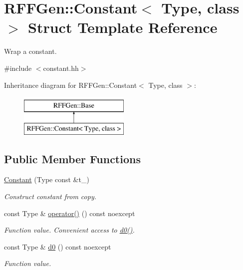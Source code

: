 \hypertarget{structRFFGen_1_1Constant}{\section{R\-F\-F\-Gen\-:\-:Constant$<$ Type, class $>$ Struct Template Reference}
\label{structRFFGen_1_1Constant}
}


Wrap a constant.  




{\ttfamily \#include $<$constant.\-hh$>$}

Inheritance diagram for R\-F\-F\-Gen\-:\-:Constant$<$ Type, class $>$\-:\begin{figure}[H]
\begin{center}
\leavevmode
\includegraphics[height=2.000000cm]{structRFFGen_1_1Constant}
\end{center}
\end{figure}
\subsection*{Public Member Functions}
\begin{DoxyCompactItemize}
\item 
\hypertarget{structRFFGen_1_1Constant_ae2d0e64d773d967430d13e47817d6d84}{\hyperlink{structRFFGen_1_1Constant_ae2d0e64d773d967430d13e47817d6d84}{Constant} (Type const \&t\-\_\-)}\label{structRFFGen_1_1Constant_ae2d0e64d773d967430d13e47817d6d84}

\begin{DoxyCompactList}\small\item\em Construct constant from copy. \end{DoxyCompactList}\item 
\hypertarget{structRFFGen_1_1Constant_a5934bfef73772d9f0870b1f53d95a6f8}{const Type \& \hyperlink{structRFFGen_1_1Constant_a5934bfef73772d9f0870b1f53d95a6f8}{operator()} () const noexcept}\label{structRFFGen_1_1Constant_a5934bfef73772d9f0870b1f53d95a6f8}

\begin{DoxyCompactList}\small\item\em Function value. Convenient access to \hyperlink{structRFFGen_1_1Constant_a185f8aa750fe120dbe255de11107b7e1}{d0()}. \end{DoxyCompactList}\item 
\hypertarget{structRFFGen_1_1Constant_a185f8aa750fe120dbe255de11107b7e1}{const Type \& \hyperlink{structRFFGen_1_1Constant_a185f8aa750fe120dbe255de11107b7e1}{d0} () const noexcept}\label{structRFFGen_1_1Constant_a185f8aa750fe120dbe255de11107b7e1}

\begin{DoxyCompactList}\small\item\em Function value. \end{DoxyCompactList}\end{DoxyCompactItemize}


